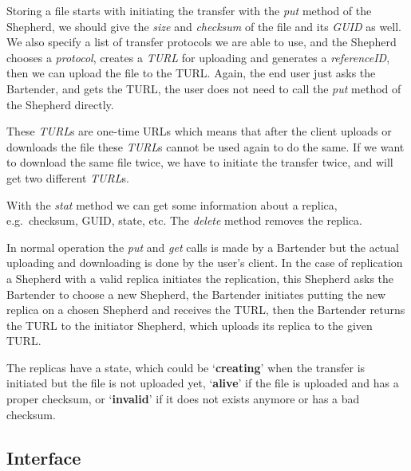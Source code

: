 \documentclass{book}
\begin{document}
Storing a file starts with initiating the transfer with the \emph{put} method of the Shepherd, we should give the \emph{size} and \emph{checksum} of the file and its \emph{GUID} as well. We also specify a list of transfer protocols we are able to use, and the Shepherd chooses a \emph{protocol}, creates a \emph{TURL} for uploading and generates a \emph{referenceID}, then we can upload the file to the TURL. Again, the end user just asks the Bartender, and gets the TURL, the user does not need to call the \emph{put} method of the Shepherd directly.

These \emph{TURL}s are one-time URLs which means that after the client uploads or downloads the file these \emph{TURL}s cannot be used again to do the same. If we want to download the same file twice, we have to initiate the transfer twice, and will get two different \emph{TURL}s.

With the \emph{stat} method we can get some information about a replica, e.g.~checksum, GUID, state, etc. The \emph{delete} method removes the replica.

In normal operation the \emph{put} and \emph{get} calls is made by a Bartender but the actual uploading and downloading is done by the user's client. In the case of replication a Shepherd with a valid replica initiates the replication, this Shepherd asks the Bartender to choose a new Shepherd, the Bartender initiates putting the new replica on a chosen Shepherd and receives the TURL, then the Bartender returns the TURL to the initiator Shepherd, which uploads its replica to the given TURL.

The replicas have a state, which could be `\textbf{creating}' when the transfer is initiated but the file is not uploaded yet, `\textbf{alive}' if the file is uploaded and has a proper checksum, or `\textbf{invalid}' if it does not exists anymore or has a bad checksum.


\subsection{Interface} %
\end{document}
